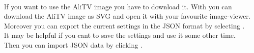 \documentclass[a4paper]{scrartcl}
\begin{document}
\paragraph*{}
If you want to use the AliTV image you have to download it. With  you can download the AliTV image as SVG and open it with your favourite image-viewer. Moreover you can export the current settings in the JSON format by selecting . It may be helpful if you cant to save the settings and use it some other time. Then you can import JSON data by clicking .
\end{document}

